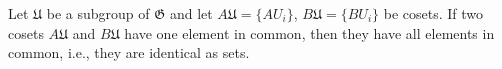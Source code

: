 Let $\mathfrak{U}$ be a subgroup of $\mathfrak{G}$ and let $A\mathfrak{U} = \{AU_i\}$, $B\mathfrak{U} = \{BU_i\}$ be cosets. If two cosets $A\mathfrak{U}$ and $B\mathfrak{U}$ have one element in common, then they have all elements in common, i.e., they are identical as sets.
